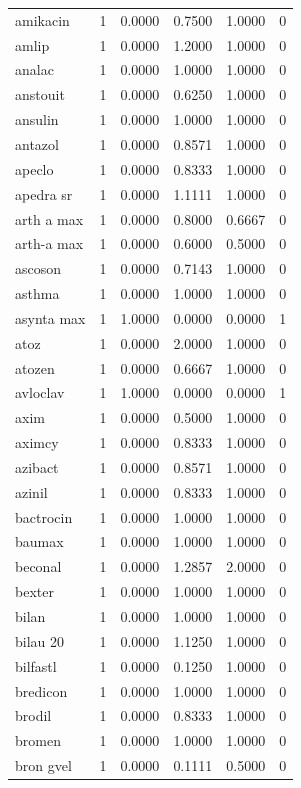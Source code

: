\begin{longtable}{p{3.0cm}rrrrr}
amikacin & 1 & 0.0000 & 0.7500 & 1.0000 & 0 \\
amlip & 1 & 0.0000 & 1.2000 & 1.0000 & 0 \\
analac & 1 & 0.0000 & 1.0000 & 1.0000 & 0 \\
anstouit & 1 & 0.0000 & 0.6250 & 1.0000 & 0 \\
ansulin & 1 & 0.0000 & 1.0000 & 1.0000 & 0 \\
antazol & 1 & 0.0000 & 0.8571 & 1.0000 & 0 \\
apeclo & 1 & 0.0000 & 0.8333 & 1.0000 & 0 \\
apedra sr & 1 & 0.0000 & 1.1111 & 1.0000 & 0 \\
arth a max & 1 & 0.0000 & 0.8000 & 0.6667 & 0 \\
arth-a max & 1 & 0.0000 & 0.6000 & 0.5000 & 0 \\
ascoson & 1 & 0.0000 & 0.7143 & 1.0000 & 0 \\
asthma & 1 & 0.0000 & 1.0000 & 1.0000 & 0 \\
asynta max & 1 & 1.0000 & 0.0000 & 0.0000 & 1 \\
atoz & 1 & 0.0000 & 2.0000 & 1.0000 & 0 \\
atozen & 1 & 0.0000 & 0.6667 & 1.0000 & 0 \\
avloclav & 1 & 1.0000 & 0.0000 & 0.0000 & 1 \\
axim & 1 & 0.0000 & 0.5000 & 1.0000 & 0 \\
aximcy & 1 & 0.0000 & 0.8333 & 1.0000 & 0 \\
azibact & 1 & 0.0000 & 0.8571 & 1.0000 & 0 \\
azinil & 1 & 0.0000 & 0.8333 & 1.0000 & 0 \\
bactrocin & 1 & 0.0000 & 1.0000 & 1.0000 & 0 \\
baumax & 1 & 0.0000 & 1.0000 & 1.0000 & 0 \\
beconal & 1 & 0.0000 & 1.2857 & 2.0000 & 0 \\
bexter & 1 & 0.0000 & 1.0000 & 1.0000 & 0 \\
bilan & 1 & 0.0000 & 1.0000 & 1.0000 & 0 \\
bilau 20 & 1 & 0.0000 & 1.1250 & 1.0000 & 0 \\
bilfastl & 1 & 0.0000 & 0.1250 & 1.0000 & 0 \\
bredicon & 1 & 0.0000 & 1.0000 & 1.0000 & 0 \\
brodil & 1 & 0.0000 & 0.8333 & 1.0000 & 0 \\
bromen & 1 & 0.0000 & 1.0000 & 1.0000 & 0 \\
bron gvel & 1 & 0.0000 & 0.1111 & 0.5000 & 0 \\

\end{longtable}
